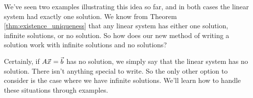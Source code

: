 We've seen two examples illustrating this idea so far, and in both cases the linear system had exactly one solution. We know from Theorem \ref{thm:existence_uniqueness} that any linear system has either one solution, infinite solutions, or no solution. So how does our new method of writing a solution work with infinite solutions and no solutions?

Certainly, if $A\vec{x_{}}=\vec{b}$ has no solution, we simply say that the linear system has no solution. There isn't anything special to write. So the only other option to consider is the case where we have infinite solutions. We'll learn how to handle these situations through examples.\\

